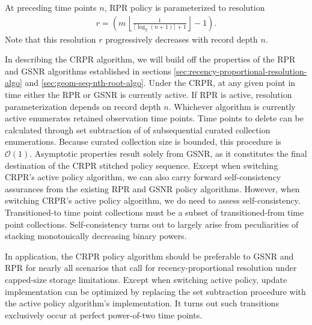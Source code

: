 At preceding time points $n$, RPR policy is parameterized to resolution
\begin{align*}
r = \left(
  m \,
  \left\lfloor
  \frac{1}{\lceil \log_2(n + 1) \rceil + 1}
  \right\rfloor
  - 1
\right).
\end{align*}
Note that this resolution $r$ progressively decreases with record depth $n$.

In describing the CRPR algorithm, we will build off the properties of the RPR and GSNR algorithms established in sections \ref{sec:recency-proportional-resolution-algo} and \ref{sec:geom-seq-nth-root-algo}.
Under the CRPR, at any given point in time either the RPR or GSNR is currently active.
If RPR is active, resolution parameterization depends on record depth $n$.
Whichever algorithm is currently active enumerates retained observation time points.
Time points to delete can be calculated through set subtraction of of subsequential curated collection enumerations.
Because curated collection size is bounded, this procedure is $\mathcal{O}(1)$.
Asymptotic properties result solely from GSNR, as it constitutes the final destination of the CRPR stitched policy sequence.
Except when switching CRPR's active policy algorithm, we can also carry forward self-consistency assurances from the existing RPR and GSNR policy algorithms.
However, when switching CRPR's active policy algorithm, we do need to assess self-consistency.
Transitioned-to time point collections must be a subset of transitioned-from time point collections.
Self-consistency turns out to largely arise from peculiarities of stacking monotonically decreasing binary powers.


In application, the CRPR policy algorithm should be preferable to GSNR and RPR for nearly all scenarios that call for recency-proportional resolution under capped-size storage limitations.
Except when switching active policy, update implementation can be optimized by replacing the set subtraction procedure with the active policy algorithm's implementation.
It turns out such transitions exclusively occur at perfect power-of-two time points.

% 
